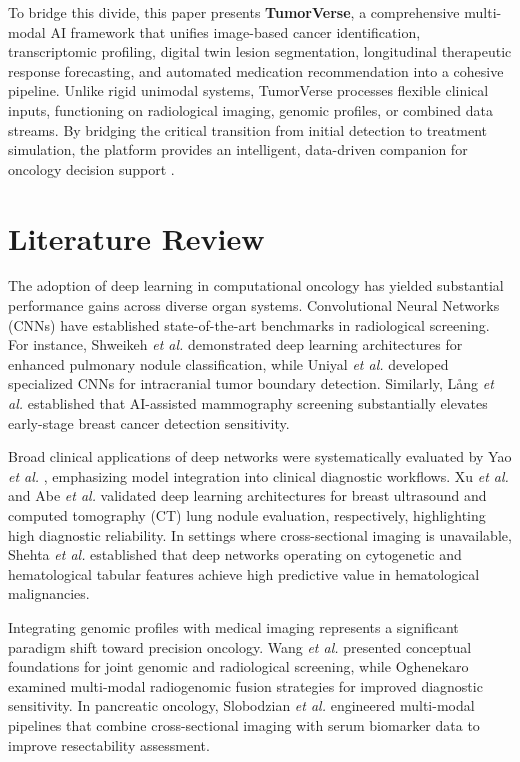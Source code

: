 \documentclass[conference]{IEEEtran}
\begin{document}
To bridge this divide, this paper presents \textbf{TumorVerse}, a comprehensive multi-modal AI framework that unifies image-based cancer identification, transcriptomic profiling, digital twin lesion segmentation, longitudinal therapeutic response forecasting, and automated medication recommendation into a cohesive pipeline. Unlike rigid unimodal systems, TumorVerse processes flexible clinical inputs, functioning on radiological imaging, genomic profiles, or combined data streams. By bridging the critical transition from initial detection to treatment simulation, the platform provides an intelligent, data-driven companion for oncology decision support \cite{esteva2024}.

\section{Literature Review}
The adoption of deep learning in computational oncology has yielded substantial performance gains across diverse organ systems. Convolutional Neural Networks (CNNs) have established state-of-the-art benchmarks in radiological screening. For instance, Shweikeh \textit{et al.} \cite{shweikeh2026} demonstrated deep learning architectures for enhanced pulmonary nodule classification, while Uniyal \textit{et al.} \cite{uniyal2026} developed specialized CNNs for intracranial tumor boundary detection. Similarly, L{\aa}ng \textit{et al.} \cite{lang2026} established that AI-assisted mammography screening substantially elevates early-stage breast cancer detection sensitivity.

Broad clinical applications of deep networks were systematically evaluated by Yao \textit{et al.} \cite{yao2025}, emphasizing model integration into clinical diagnostic workflows. Xu \textit{et al.} \cite{xu2025} and Abe \textit{et al.} \cite{abe2025} validated deep learning architectures for breast ultrasound and computed tomography (CT) lung nodule evaluation, respectively, highlighting high diagnostic reliability. In settings where cross-sectional imaging is unavailable, Shehta \textit{et al.} \cite{shehta2025} established that deep networks operating on cytogenetic and hematological tabular features achieve high predictive value in hematological malignancies.

Integrating genomic profiles with medical imaging represents a significant paradigm shift toward precision oncology. Wang \textit{et al.} \cite{wang2025} presented conceptual foundations for joint genomic and radiological screening, while Oghenekaro \cite{oghenekaro2025} examined multi-modal radiogenomic fusion strategies for improved diagnostic sensitivity. In pancreatic oncology, Slobodzian \textit{et al.} \cite{slobodzian2025} engineered multi-modal pipelines that combine cross-sectional imaging with serum biomarker data to improve resectability assessment.
\end{document}
